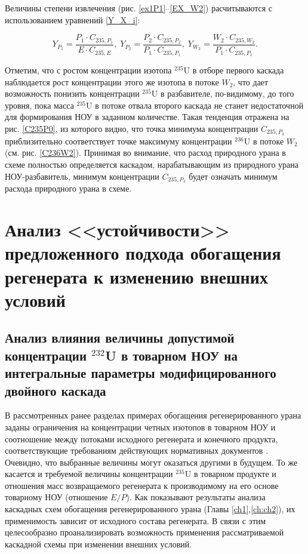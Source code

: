 Величины степени извлечения (рис. \ref{ex1P1}--\ref{EX_W2}) расчитываются с использованием уравнений \ref{Y_X_i}: 

\begin{equation}\label{Y_X_i}
    Y_{P_1} = \frac{P_1 \cdot C_{235,{P_1}}}{E \cdot C_{235,{E}}} ,\; 
    Y_{P_2} = \frac{P_2 \cdot C_{235,{P_2}}}{P_1 \cdot C_{235,{P_1}}} ,\; 
    Y_{W_2} = \frac{W_2 \cdot C_{235,{W_2}}}{P_1 \cdot C_{235,{P_1}}}.
\end{equation}

Отметим, что с ростом концентрации изотопа $^{235}$U в отборе первого каскада наблюдается рост концентрации этого же изотопа в потоке $W_2$, что дает возможность понизить концентрации $^{235}$U в разбавителе, по-видимому, до того уровня, пока масса $^{235}$U в потоке отвала второго каскада не станет недостаточной для формирования НОУ в заданном количестве. Такая тенденция отражена на рис. \ref{C235P0}, из которого видно, что точка минимума концентрации $C_{235,{P_3}}$ приблизительно соответствует точке максимуму концентрации $^{236}$U в потоке $W_2$ (см. рис. \ref{C236W2}). Принимая во внимание, что расход природного урана в схеме полностью определяется каскадом, нарабатывающим из природного урана НОУ-разбавитель, минимум концентрации $C_{235,{P_3}}$ будет означать минимум расхода природного урана в схеме.


\section{Анализ <<устойчивости>> предложенного подхода обогащения регенерата к изменению внешних условий}
\subsection{Анализ влияния величины допустимой концентрации $^{232}$U в товарном НОУ на интегральные параметры модифицированного двойного каскада}

В рассмотренных ранее разделах примерах обогащения регенерированного урана заданы ограничения на концентрации четных изотопов в товарном НОУ и соотношение между потоками исходного регенерата и конечного продукта, соответствующие требованиям действующих нормативных документов  \cite{smirnovEvolutionIsotopicComposition2012,smirnovKaskadnyeShemyZadachah2012}. Очевидно, что выбранные величины могут оказаться другими в будущем. То же касается и требуемой величины концентрации $^{235}$U в товарном продукте и отношения масс возвращаемого регенерата к производимому на его основе товарному НОУ (отношение $E/P$). Как показывают результаты анализа каскадных схем обогащения регенерированного урана (Главы \ref{ch1},\ref{ch:ch2}), их применимость зависит от исходного состава регенерата. В связи с этим целесообразно проанализировать возможность применения рассматриваемой каскадной схемы при изменении внешних условий.

